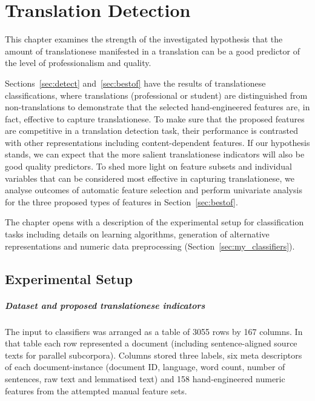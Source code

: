 \chapter{\label{cha:translationese}Translation Detection}
This chapter examines the strength of the investigated hypothesis that the amount of translationese manifested in a translation can be a good predictor of the level of professionalism and quality. 

Sections~\ref{sec:detect} and~\ref{sec:bestof} have the results of translationese classifications, where translations (professional or student) are distinguished from non-translations to demonstrate that the selected hand-engineered features are, in fact, effective to capture translationese. 
To make sure that the proposed features are competitive in a translation detection task, their performance is contrasted with other representations including content-dependent features. 
If our hypothesis stands, we can expect that the more salient translationese indicators will also be good quality predictors. 
To shed more light on feature subsets and individual variables that can be considered most effective in capturing translationese, we analyse outcomes of automatic feature selection and perform univariate analysis for the three proposed types of features in Section~\ref{sec:bestof}.

The chapter opens with a description of the experimental setup for classification tasks including details on learning algorithms, generation of alternative representations and numeric data preprocessing (Section~\ref{sec:my_classifiers}).

\section{\label{sec:my_classifiers}Experimental Setup}

\paragraph{Dataset and proposed translationese indicators} The input to classifiers was arranged as a table of 3055 rows by 167 columns. In that table each row represented a document (including sentence-aligned source texts for parallel subcorpora). Columns stored three labels, six meta descriptors of each document-instance (document ID, language, word count, number of sentences, raw text and lemmatised text) and 158 hand-engineered numeric features from the attempted manual feature sets. 

